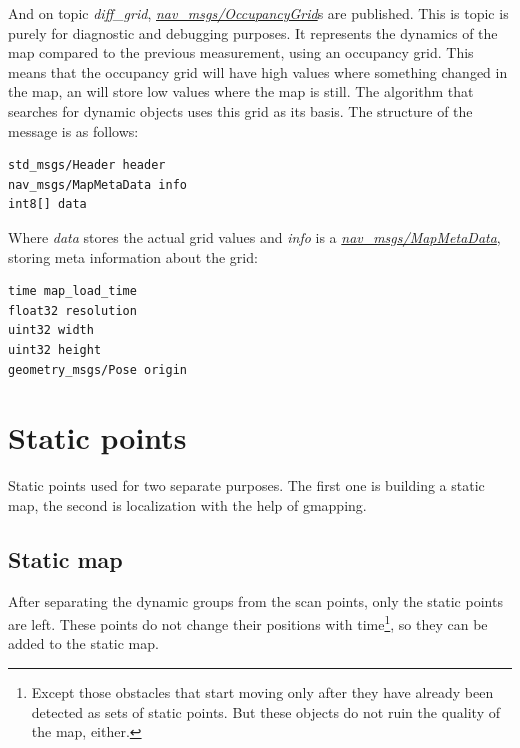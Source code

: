 And on topic \textit{diff\_grid}, \href{http://docs.ros.org/melodic/api/nav_msgs/html/msg/OccupancyGrid.html}{\textit{nav\_msgs/OccupancyGrid}}s are published. This is topic is purely for diagnostic and debugging purposes. It represents the dynamics of the map compared to the previous measurement, using an occupancy grid. This means that the occupancy grid will have high values where something changed in the map, an will store low values where the map is still. The algorithm that searches for dynamic objects uses this grid as its basis. The structure of the message is as follows:

\begin{minipage}{\textwidth}
\begin{lstlisting}[language=IDL]
std_msgs/Header header
nav_msgs/MapMetaData info
int8[] data
\end{lstlisting}
\end{minipage}

Where \textit{data} stores the actual grid values and \textit{info} is a \href{http://docs.ros.org/melodic/api/nav_msgs/html/msg/MapMetaData.html}{\textit{nav\_msgs/MapMetaData}}, storing meta information about the grid:

\begin{minipage}{\textwidth}
\begin{lstlisting}[language=IDL]
time map_load_time
float32 resolution
uint32 width
uint32 height
geometry_msgs/Pose origin
\end{lstlisting}
\end{minipage}

\section{Static points}
Static points used for two separate purposes. The first one is building a static map, the second is localization with the help of gmapping.

\subsection{Static map}
\label{chap:static_map}
After separating the dynamic groups from the scan points, only the static points are left. These points do not change their positions with time\footnote{Except those obstacles that start moving only after they have already been detected as sets of static points. But these objects do not ruin the quality of the map, either.}, so they can be added to the static map.

